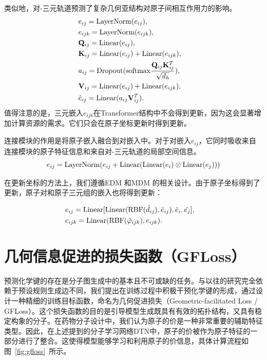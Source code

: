类似地，对-三元轨道预测了复杂几何亚结构对原子间相互作用力的影响。
\begin{eqnarray}
    &e_{ij} = {\rm LayerNorm}(e_{ij}),&\\
    &e_{ijk} = {\rm LayerNorm}(e_{ijk}),&\\
    &\mathbf{Q}_{ij} = {\rm Linear}(e_{ij}),& \\ 
    &\mathbf{K}_{ij} = {\rm Linear}(e_{ij}) + {\rm Linear}(e_{ijk}),& \\
    &a_{ij}= {\rm Dropout}({\rm softmax} \frac{\mathbf{Q}_{ij} \mathbf{K}_{ij}^T}{\sqrt{d_h}}), & \\
    &\mathbf{V}_{ij} = {\rm Linear}(e_{ij}) + {\rm Linear}(e_{ijk}),& \\
    &\hat{e}_{ij} = {\rm Linear}(a_{ij} \mathbf{V}_{ij}^T).&
\end{eqnarray}
值得注意的是，三元嵌入$e_{ijk}$在Transformer结构中不会得到更新，因为这会显著增加计算资源的需求。它们只会在原子坐标更新时得到更新。

连接模块的作用是将原子嵌入融合到对嵌入中。对于对嵌入$e_{ij}$，它同时吸收来自连接模块的原子特征信息和来自对-三元轨道的局部空间信息。
\begin{equation}
    e_{ij} = {\rm LayerNorm}(e_{ij} + {\rm Linear}({\rm Linear}(e_i) \otimes {\rm Linear}(e_j)))
\end{equation}

在更新坐标的方法上，我们遵循EDM \cite{edm_hoogeboom_22}和MDM \cite{mdm_huang_23}的相关设计。由于原子坐标得到了更新，原子对和原子三元组的嵌入也将得到更新：

\begin{eqnarray}
  &e_{ij} = {\rm Linear}[{\rm Linear}({\rm RBF}(\hat{d}_{ij}), \hat{e}_{ij}), \hat{e}_i, \hat{e_j}],& \\
  &e_{ijk} = {\rm Linear}({\rm RBF}(\hat{\varphi}_{ijk}), e_{ijk}). &
\end{eqnarray}

\section{几何信息促进的损失函数（GFLoss）}
预测化学键的存在是分子图生成中的基本且不可或缺的任务。与以往的研究完全依赖于预设规则生成边不同，我们提出在训练过程中积极干预化学键的形成，通过设计一种精细的训练目标函数，命名为几何促进损失（Geometric-facilitated Loss / GFLoss）。这个损失函数的目的是引导模型生成既具有有效的拓扑结构，又具有稳定构象的分子。在药物分子设计中，我们认为原子的价是一种非常重要的辅助特征类型。因此，在上述提到的分子学习网络DTN中，原子的价被作为原子特征的一部分进行了整合。这使得模型能够学习和利用原子的价信息，具体计算流程如图~\ref{fig:gfloss}~所示。

